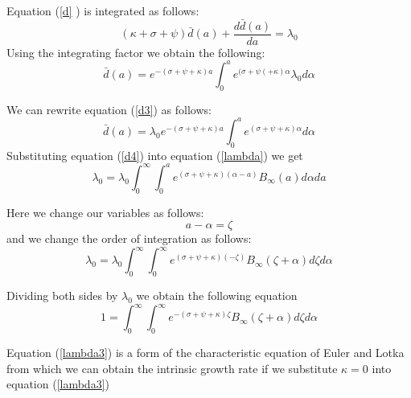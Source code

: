  Equation (\ref{d} ) is integrated as follows:
 \begin{equation}\label{d1}
 (\kappa +\sigma + \psi)\bar{d}(a)  +  \frac{d \bar{d}(a)}{da}= \lambda_0  
 \end{equation}
 Using the integrating factor we obtain the following:
 \begin{equation}\label{d3}
 \bar{d}(a)=e^{-(\sigma+ \psi + \kappa)a}\int_{0}^{a} e^{(\sigma + \psi( + \kappa) \alpha} \lambda_0  d \alpha
 \end{equation}
 
 We can rewrite equation (\ref{d3}) as follows:
 \begin{equation}\label{d4}
 \bar{d}(a)=\lambda_0  e^{-(\sigma + \psi + \kappa)a}\int_{0}^{a} e^{(\sigma + \psi + \kappa) \alpha}  d \alpha
 \end{equation}
 Substituting equation (\ref{d4}) into equation (\ref{lambda}) we get \\
 
 
 \begin{equation}\label{lambda1}
\lambda_0= \lambda_0 \int_{0}^{\infty}   \int_{0}^{a} e^{(\sigma + \psi + \kappa)(\alpha-a)}  B_{\infty} (a) d \alpha da
\end{equation} 

Here we change our variables as follows:\\
\[a-\alpha= \zeta\] and we change the order of integration as follows:\\

\begin{equation}\label{lambda2}
\lambda_0= \lambda_0 \int_{0}^{\infty}   \int_{0}^{\infty} e^{(\sigma + \psi + \kappa)(-\zeta)}  B_{\infty} (\zeta + \alpha) d \zeta d \alpha 
\end{equation} 

Dividing both sides by $\lambda_0$ we obtain the following equation\\
\begin{equation}\label{lambda3}
1= \int_{0}^{\infty}   \int_{0}^{\infty} e^{-(\sigma + \psi + \kappa)\zeta}  B_{\infty} (\zeta + \alpha) d \zeta d \alpha
\end{equation} 

Equation (\ref{lambda3}) is a form of the characteristic equation of Euler and Lotka from which we can obtain the intrinsic growth rate if we substitute $\kappa=0$ into equation (\ref{lambda3})


